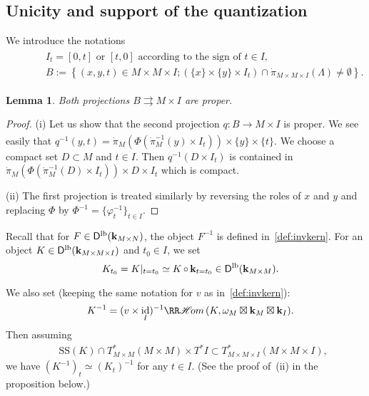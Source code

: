 \documentclass[12pt,leqno]{article}
\newtheorem{lemma}[theorem]{Lemma}
\theoremstyle{definition}
\def\phi{{\varphi}}
\newcommand{\cor}{{\bf k}}
\renewcommand{\to}[1][]{\xrightarrow[]{#1}}
\newcommand{\tto}{\rightrightarrows}
\newcommand{\rhom}[1][]{{\RR\mathscr{H}\mspace{-3mu}om}_{\raise1.5ex\hbox to.1em{}#1}}
\newcommand{\etens}{\mathbin{\boxtimes}}
\newcommand{\conv}[1][]{\mathop{\circ}\limits_{#1}}
\newcommand{\opb}[1]{#1^{-1}}
\newcommand{\eqdot}{\mathbin{:=}}
\newcommand{\cl}{\colon}
\newcommand{\ba}{\begin{array}}
\newcommand{\ea}{\end{array}}
\newcommand{\eq}{\begin{eqnarray}}
\newcommand{\eneq}{\end{eqnarray}}
\newcommand{\eqn}{\begin{eqnarray*}}
\newcommand{\eneqn}{\end{eqnarray*}}
\newcommand{\set}[2]{\left\{#1 \mathbin{;} #2 \right\}}
\DeclareMathOperator{\id}{id}
\newcommand{\Der}[1][]{\mathsf{D}^{#1}}
\newcommand{\Derlb}{\Der[\mathrm{lb}]}
\newcommand{\SSi}{\mathrm{SS}}
\numberwithin{equation}{section}
\begin{document}
\subsection{Unicity and support of the quantization}
We introduce the notations
\eq\label{not:B}
&&\ba{rcl}
&&I_t = [0,t] \mbox{ or }[t,0] \mbox{ according to the sign of }t\in I,\\
&&B\eqdot \set{(x,y,t)\in M\times M\times I}{ (\{x\} \times \{y\} \times I_t) 
\cap \dot\pi_{M\times M\times I}(\Lambda) \not= \emptyset}.
\ea\eneq
\begin{lemma}\label{le:ttoproper}
Both projections $B\tto M\times I$ are proper.
\end{lemma}
\begin{proof}
(i) Let us show that the second projection $q\cl B\to M\times I$ is proper.
We see easily that
$\opb{q}(y,t) = \dot\pi_M( \Phi(\opb{\dot\pi_M}(y)\times I_t))
\times \{y\} \times \{t\}$.
We choose a compact set $D\subset M$ and $t\in I$.  Then
$\opb{q}(D\times I_t)$ is contained in
$\dot\pi_M( \Phi(\opb{\dot\pi_M}(D)\times I_t)) \times D \times I_t$
which is compact.

\noindent
(ii) The first projection is treated similarly by reversing 
the roles of $x$ and $y$ and replacing $\Phi$ by
$\opb\Phi =\{\opb{\phi_t} \}_{t\in I}$.
\end{proof}
Recall that for $F\in\Derlb(\cor_{M\times N})$, 
the object $\opb{F}$ is defined in~\eqref{def:invkern}. For 
an object $K\in\Derlb(\cor_{M\times M\times I})$ and $t_0\in I$, we set 
\eqn
&&K_{t_0}=K\vert_{t=t_0}\simeq K\conv\cor_{t=t_0}\in\Derlb(\cor_{M\times M}).
\eneqn
We also set (keeping the same notation for $v$ as in~\eqref{def:invkern}):
\eqn
&&K^{-1} = \opb{(v\times\id_I)}\rhom(K,\omega_M\etens\cor_M\etens\cor_I).
\eneqn
Then assuming
\eqn
&&\SSi(K)\cap T^*_{M\times M}(M\times M)\times T^*I\subset
T^*_{M\times M\times I}(M\times M \times I), 
\eneqn
we have $(K^{-1})_t \simeq (K_t)^{-1}$ for any $t\in I$. 
(See the proof of~(ii) in the proposition below.) 
\end{document}
